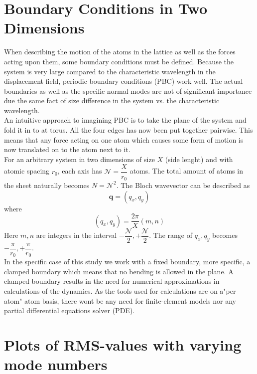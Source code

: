 \section{Boundary Conditions in Two Dimensions}\label{BC}
When describing the motion of the atoms in the lattice as well as the forces acting upon them, some boundary conditions must be defined. Because the system is very large compared to the characteristic wavelength in the displacement field, periodic boundary conditions (PBC) work well. The actual boundaries as well as the specific normal modes are not of significant importance due the same fact of size difference in the system vs. the characteristic wavelength. \\
An intuitive approach to imagining PBC is to take the plane of the system and fold it in to at torus. All the four edges has now been put together pairwise. This means that any force acting on one atom which causes some form of motion is now translated on to the atom next to it.\\
For an arbitrary system in two dimensions of size $X$ (side lenght) and with atomic spacing $r_{0}$, each axis has $\mathcal{N}=\dfrac{X}{r_{0}}$ atoms. The total amount of atoms in the sheet naturally becomes $N=\mathcal{N}^{2}$. The Bloch wavevector can be described as
\begin{equation}
     \mathbf{q}=(q_{x},q_{y})
\end{equation}
where
\begin{equation}
     (q_{x},q_{y})=\dfrac{2\pi}{X}(m,n)
\end{equation}
Here $m,n$ are integers in the interval $-\dfrac{\mathcal{N}}{2}, +\dfrac{\mathcal{N}}{2}$. The range of $q_{x},q_{y}$ becomes $-\dfrac{\pi}{r_{0}},+\dfrac{\pi}{r_{0}}$.\\
In the specific case of this study we work with a fixed boundary, more specific, a clamped boundary which means that no bending is allowed in the plane. A clamped boundary results in the need for numerical approximations in calculations of the dynamics. As the tools used for calculations are on a"per atom" atom basis, there wont be any need for finite-element models nor any partial differential equations solver (PDE).

\section{Plots of RMS-values with varying mode numbers}\label{PLOTZ}

